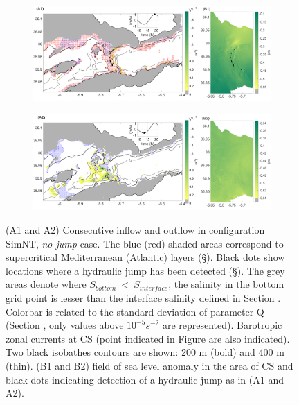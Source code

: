 \begin{figure}[!h]
 \centering
 
 \begin{subfigure}{\linewidth}
\centering
\includegraphics[width=1\linewidth]{./GBR3D/ME2_19h_corrC1.png}
\end{subfigure}
 
 \begin{subfigure}{\linewidth}
\centering
\includegraphics[width=\linewidth]{./GBR3D/ME2_13h_corrC1.png}
\end{subfigure}
\caption [Supercritical flow, location of hydraulic jump, standard deviation of parameter $Q$ in SimNT.]{ (A1 and A2) Consecutive inflow and outflow in configuration SimNT, \textit{no-jump} case. The blue (red) shaded areas correspond to supercritical Mediterranean (Atlantic) layers (\S {}). Black dots show locations where a hydraulic jump has been detected (\S {}). The grey areas denote where $S_{bottom}\ <\ S_{interface}$, the salinity in the bottom grid point is lesser than the interface salinity defined in Section . Colorbar is related to the standard deviation of parameter Q (Section , only values above $10^{-5} s^{-2}$ are represented). Barotropic zonal currents at CS (point indicated in Figure  are also indicated). Two black isobathes contours are shown: 200 m (bold) and 400 m (thin). (B1 and B2) field of sea level anomaly in the area of CS and black dots indicating detection of a hydraulic jump as in (A1 and A2).}
\label{FigHCN}
\end{figure}

